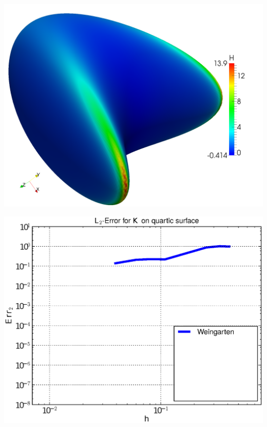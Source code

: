 \documentclass{beamer}
\begin{document}
\begin{frame}
\begin{overprint}
\begin{minipage}[t]{0.49\textwidth}
              \centering\includegraphics[width=\textwidth]{bilder/Curvature/heineB/H250k.png}
          \end{minipage}
          \begin{minipage}[t]{0.49\textwidth}
            \centering\includegraphics[width=\textwidth]{bilder/Curvature/heineB/ErrKL2_1.eps}
          \end{minipage}\hfill
          \begin{minipage}[t]{0.49\textwidth}

\end{minipage}
\end{overprint}
\end{frame}
\end{document}
